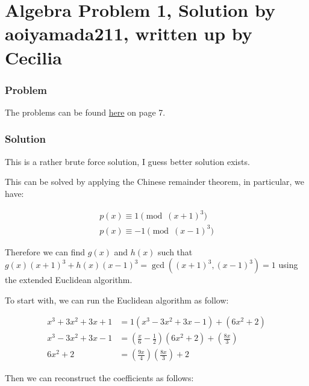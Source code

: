 \section*{Algebra Problem 1, Solution by aoiyamada211, written up by Cecilia}
\subsubsection*{Problem}
The problems can be found \href{https://www.math.hkust.edu.hk/~makyli/190_2010Sp/problemBk.pdf}{here} on page 7.

\subsubsection*{Solution}
This is a rather brute force solution, I guess better solution exists.

This can be solved by applying the Chinese remainder theorem, in particular, we have:

\begin{align*}
  p(x) \equiv 1 \pmod{(x+1)^3} \\
  p(x) \equiv -1 \pmod{(x-1)^3}
\end{align*}

Therefore we can find $ g(x) $ and $ h(x) $ such that $ g(x)(x+1)^3 + h(x)(x-1)^3 = \gcd((x+1)^3, (x-1)^3) = 1 $ using the extended Euclidean algorithm.

To start with, we can run the Euclidean algorithm as follow:

\begin{align*}
x^3 + 3x^2 + 3x + 1 &= 1                                      (x^3 - 3x^2 + 3x - 1)      + (6x^2 + 2)                 \\
x^3 - 3x^2 + 3x - 1 &= \left(\frac{x}{6} - \frac{1}{2}\right) (6x^2 + 2)                 + \left(\frac{8x}{3}\right)  \\
6x^2 + 2            &= \left(\frac{9x}{4}\right)               \left(\frac{8x}{3}\right) + 2 
\end{align*}

Then we can reconstruct the coefficients as follows:

